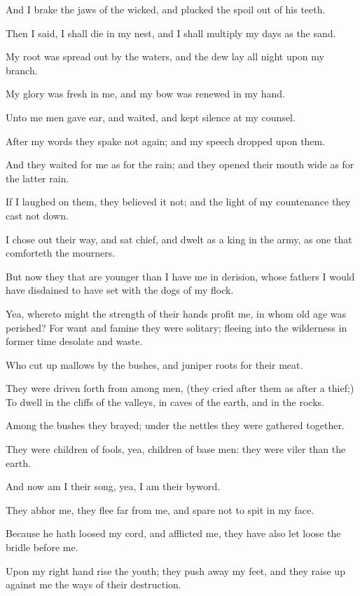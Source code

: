 \Verse And I brake the jaws of the wicked, and plucked the spoil out of his teeth.

\Verse Then I said, I shall die in my nest, and I shall multiply my days as the sand.

\Verse My root was spread out by the waters, and the dew lay all night upon my branch.

\Verse My glory was fresh in me, and my bow was renewed in my hand.

\Verse Unto me men gave ear, and waited, and kept silence at my counsel.

\Verse After my words they spake not again; and my speech dropped upon them.

\Verse And they waited for me as for the rain; and they opened their mouth wide as for the latter rain.

\Verse If I laughed on them, they believed it not; and the light of my countenance they cast not down.

\Verse I chose out their way, and sat chief, and dwelt as a king in the army, as one that comforteth the mourners.


\Chapter
\Verse But now they that are younger than I have me in derision, whose fathers I would have disdained to have set with the dogs of my flock.

\Verse Yea, whereto might the strength of their hands profit me, in whom old age was perished?  \Verse For want and famine they were solitary; fleeing into the wilderness in former time desolate and waste.

\Verse Who cut up mallows by the bushes, and juniper roots for their meat.

\Verse They were driven forth from among men, (they cried after them as after a thief;) \Verse To dwell in the cliffs of the valleys, in caves of the earth, and in the rocks.

\Verse Among the bushes they brayed; under the nettles they were gathered together.

\Verse They were children of fools, yea, children of base men: they were viler than the earth.

\Verse And now am I their song, yea, I am their byword.

\Verse They abhor me, they flee far from me, and spare not to spit in my face.

\Verse Because he hath loosed my cord, and afflicted me, they have also let loose the bridle before me.

\Verse Upon my right hand rise the youth; they push away my feet, and they raise up against me the ways of their destruction.

